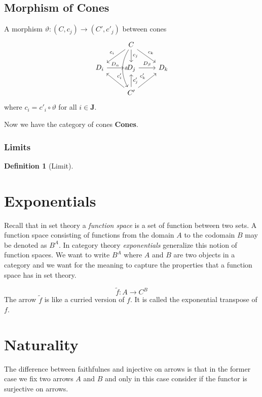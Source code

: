 \documentclass{book}
\theoremstyle{definition}
\newtheorem{definition}{Definition}[section]
\begin{document}
\section{Morphism of Cones}

A morphism $\vartheta : (C, c_j) \to (C', c'_j)$ between cones
\[
\begin{tikzcd}
  & C \arrow[dl, "c_i"'] \arrow[d, "c_j"] \arrow[dr, "c_k"] \arrow[dd, "\vartheta", bend right] \\
  D_i \arrow[r,"D_\alpha"] & D_j \arrow[r, "D_\beta"]  & D_k \\
  & C' \arrow[ul, "c'_i"'] \arrow[u, "c'_j"'] \arrow[ur, "c'_k"]
\end{tikzcd}
\]
where $c_i = c'_i \circ \vartheta$ for all $i \in \textbf{J}$.

Now we have the category of cones \textbf{Cones}.

\subsection{Limits}

\begin{definition}[Limit]
\end{definition}

\chapter{Exponentials}

Recall that in set theory a \emph{function space} is a set of function between
two sets. A function space consisting of functions from the domain $A$ to the
codomain $B$ may be denoted as $B^{A}$. In category theory \emph{exponentials}
generalize this notion of function spaces. We want to write $B^{A}$ where $A$
and $B$ are two objects in a category and we want for the meaning to capture the
properties that a function space has in set theory.

\[
  \tilde{f} : A \to C^{B}
\]
The arrow $\tilde{f}$ is like a curried version of $f$. It is called the
exponential transpose of $f$.

\chapter{Naturality}

The difference between faithfulnes and injective on arrows is that in the former
case we fix two arrows $A$ and $B$ and only in this case consider if the functor
is surjective on arrows.
\end{document}
